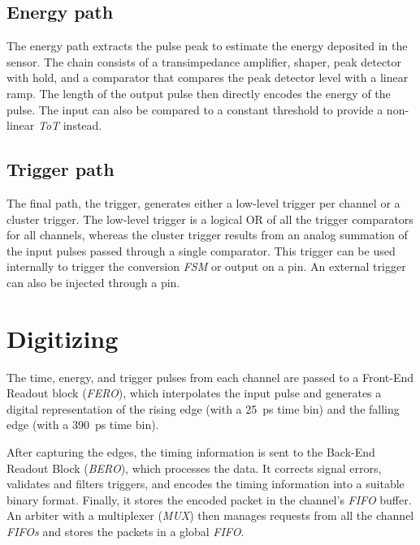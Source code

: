 \subsection{Energy path}
The energy path extracts the pulse peak to estimate the energy deposited in the sensor. The chain consists of a transimpedance amplifier, shaper, peak detector with hold, and a comparator that compares the peak detector level with a linear ramp. The length of the output pulse then directly encodes the energy of the pulse. The input can also be compared to a constant threshold to provide a non-linear \emph{ToT} instead. \cite{ficDatasheet}

\subsection{Trigger path}
The final path, the trigger, generates either a low-level trigger per channel or a cluster trigger. The low-level trigger is a logical OR of all the trigger comparators for all channels, whereas the cluster trigger results from an analog summation of the input pulses passed through a single comparator. This trigger can be used internally to trigger the conversion \emph{FSM} or output on a pin. An external trigger can also be injected through a pin. \cite{ficDatasheet}



\section{Digitizing}
\label{sec:fastic_digitizing}
The time, energy, and trigger pulses from each channel are passed to a Front-End Readout block (\emph{FERO}), which interpolates the input pulse and generates a digital representation of the rising edge (with a \SI{25}{\pico\second} time bin) and the falling edge (with a \SI{390}{\pico\second} time bin). \cite{ficDatasheet}

After capturing the edges, the timing information is sent to the Back-End Readout Block (\emph{BERO}), which processes the data. It corrects signal errors, validates and filters triggers, and encodes the timing information into a suitable binary format. Finally, it stores the encoded packet in the channel's \emph{FIFO} buffer. An arbiter with a multiplexer (\emph{MUX}) then manages requests from all the channel \emph{FIFOs} and stores the packets in a global \emph{FIFO}. \cite{ficDatasheet}

